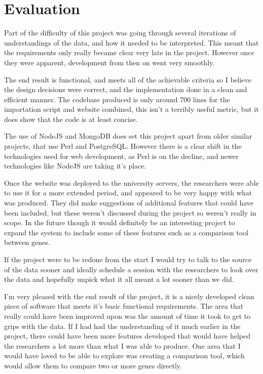 \chapter{Evaluation}
Part of the difficulty of this project was going through several iterations of understandings of the data, and how it needed to be interpreted. This meant that the requirements only really became clear very late in the project. However once they were apparent, development from then on went very smoothly.

The end result is functional, and meets all of the achievable criteria so I believe the design decisions were correct, and the implementation done in a clean and efficient manner. The codebase produced is only around 700 lines for the importation script and website combined, this isn't a terribly useful metric, but it does show that the code is at least concise.

The use of NodeJS and MongoDB does set this project apart from older similar projects, that use Perl and PostgreSQL. However there is a clear shift in the technologies used for web development, as Perl is on the decline\cite{perl-market}, and newer technologies like NodeJS are taking it's place. 

Once the website was deployed to the university servers, the researchers were able to use it for a more extended period, and appeared to be very happy with what was produced. They did make suggestions of additional features that could have been included, but these weren't discussed during the project so weren't really in scope. In the future though it would definitely be an interesting project to expand the system to include some of these features such as a comparison tool between genes.

If the project were to be redone from the start I would try to talk to the source of the data sooner and ideally schedule a session with the researchers to look over the data and hopefully unpick what it all meant a lot sooner than we did. 

I'm very pleased with the end result of the project, it is a nicely developed clean piece of software that meets it's basic functional requirements. The area that really could have been improved upon was the amount of time it took to get to grips with the data. If I had had the understanding of it much earlier in the project, there could have been more features developed that would have helped the researchers a lot more than what I was able to produce. One area that I would have loved to be able to explore was creating a comparison tool, which would allow them to compare two or more genes directly. 

